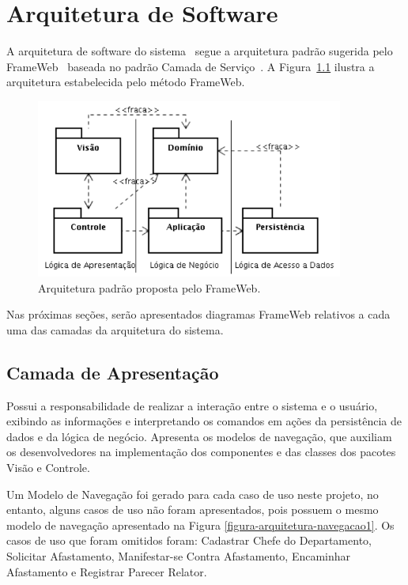 
\chapter{Arquitetura de Software}
\label{sec-arquitetura}

A arquitetura de software do sistema~\imprimirtitulo \,\,segue a arquitetura padrão sugerida pelo FrameWeb~\cite{souza:masterthesis07,souza-et-al:iism09} baseada no padrão Camada de Serviço~\cite{fowler:book02}. A Figura~\ref{figura-arquitetura-padrao} ilustra a arquitetura estabelecida pelo método FrameWeb.

\begin{figure}[h]
	\centering
	\includegraphics[width=0.9\textwidth]{figuras/figura-arquitetura-padrao.png}
	\caption{Arquitetura padrão proposta pelo FrameWeb.}
	\label{figura-arquitetura-padrao}
\end{figure}

Nas próximas seções, serão apresentados diagramas FrameWeb relativos a cada uma das camadas da arquitetura do sistema.


\section{Camada de Apresentação}
\label{sec-arquitetura-apresentacao}


Possui a responsabilidade de realizar a interação entre o sistema e o usuário, exibindo as informações e interpretando os comandos em ações da persistência de dados e da lógica de negócio. Apresenta os modelos de navegação, que auxiliam os desenvolvedores na implementação dos componentes e das classes dos pacotes Visão e Controle.

Um Modelo de Navegação foi gerado para cada caso de uso neste projeto, no entanto, alguns casos de uso não foram apresentados, pois possuem o mesmo modelo de navegação apresentado na Figura \ref{figura-arquitetura-navegacao1}. Os casos de uso que foram omitidos foram: Cadastrar Chefe do Departamento, Solicitar Afastamento, Manifestar-se Contra Afastamento, Encaminhar Afastamento e Registrar Parecer Relator.  

